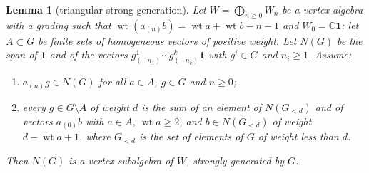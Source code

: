 \documentclass[leqno]{article}
\newcommand{\Cbb}{\ensuremath{\mathbb{C}}}
\renewcommand{\geq}{\ensuremath{\geqslant}}
\newtheorem{lemma}[thm]{Lemma}
\numberwithin{equation}{section}
\begin{document}
\begin{lemma}[triangular strong generation]
\label{lem:triangular}
Let $W = \bigoplus_{n \geq 0} W_n$ be a vertex algebra with a grading such that $\operatorname{wt}(a_{(n)}b) = \operatorname{wt}a + \operatorname{wt}b - n - 1$ and $W_0 = \Cbb\mathbf 1$; let $A \subset G$ be finite sets of homogeneous vectors of positive weight. Let $N(G)$ be the span of $\mathbf 1$ and of the vectors $g^1_{(-n_1)}\cdots g^k_{(-n_k)}\mathbf 1$ with $g^i \in G$ and $n_i \geq 1$. Assume:
\begin{enumerate}
\item $a_{(n)}g \in N(G)$ for all $a \in A$, $g \in G$ and $n \geq 0$;
\item every $g \in G \setminus A$ of weight $d$ is the sum of an element of $N(G_{<d})$ and of vectors $a_{(0)}b$ with $a \in A$, $\operatorname{wt}a \geq 2$, and $b \in N(G_{<d})$ of weight $d - \operatorname{wt}a + 1$, where $G_{<d}$ is the set of elements of $G$ of weight less than $d$.
\end{enumerate}
Then $N(G)$ is a vertex subalgebra of $W$, strongly generated by $G$.
\end{lemma}
\end{document}

